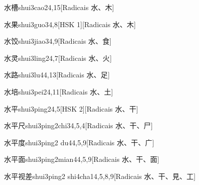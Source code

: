 \begin{entry}{水槽}{shui3cao2}{4,15}[Radicais ⽔、⽊]
\end{entry}

\begin{entry}{水果}{shui3guo3}{4,8}[HSK 1][Radicais ⽔、⽊]
\end{entry}

\begin{entry}{水饺}{shui3jiao3}{4,9}[Radicais ⽔、⾷]
\end{entry}

\begin{entry}{水灵}{shui3ling2}{4,7}[Radicais ⽔、⽕]
\end{entry}

\begin{entry}{水路}{shui3lu4}{4,13}[Radicais ⽔、⾜]
\end{entry}

\begin{entry}{水培}{shui3pei2}{4,11}[Radicais ⽔、⼟]
\end{entry}

\begin{entry}{水平}{shui3ping2}{4,5}[HSK 2][Radicais ⽔、⼲]
\end{entry}

\begin{entry}{水平尺}{shui3ping2chi3}{4,5,4}[Radicais ⽔、⼲、⼫]
\end{entry}

\begin{entry}{水平度}{shui3ping2 du4}{4,5,9}[Radicais ⽔、⼲、⼴]
\end{entry}

\begin{entry}{水平面}{shui3ping2mian4}{4,5,9}[Radicais ⽔、⼲、⾯]
\end{entry}

\begin{entry}{水平视差}{shui3ping2 shi4cha1}{4,5,8,9}[Radicais ⽔、⼲、⾒、⼯]
\end{entry}

